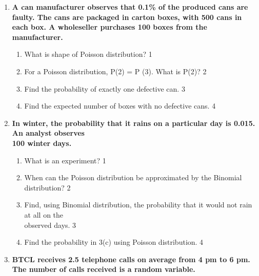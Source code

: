 \documentclass[a4paper,oneside]{book}
\begin{document}
\begin{enumerate}
  \begin{enumerate}
    \item
	What is another way to write $P(X \ge 1)$? \hfill 1
    \item
	Can the mean of Poisson distribution be negative? \hfill 2
    \item  
	From the given stem, find mean and variance. \hfill 3
    \item
	Find the expected frequencies and comment. \hfill 4
  \end{enumerate}
  
 \item
	  \textbf{A can manufacturer observes that 0.1\% of the produced cans are faulty. The cans are packaged in carton boxes, with 500 cans in each box. A wholeseller purchases 100 boxes from the manufacturer.} 
  
  \begin{enumerate}
    \item
	What is shape of Poisson distribution? \hfill 1
    \item
	For a Poisson distribution, P(2) = P (3). What is P(2)? \hfill 2
    \item  
	Find the probability of exactly one defective can. \hfill 3
    \item
	Find the expected number of boxes with no defective cans. \hfill 4
  \end{enumerate}
  
  \item
  \textbf{In winter, the probability that it rains on a particular day is 0.015. An analyst observes \\ 100 winter days.}
 
  \begin{enumerate}
    \item
	What is an experiment? \hfill 1
    \item
    	When can the Poisson distribution be approximated by the Binomial distribution? \hfill 2
    \item
    	Find, using Binomial distribution, the probability that  it would not rain at all on the \\ observed days. \hfill 3
     \item
     	Find the probability in 3(c) using Poisson distribution.  \hfill 4
  \end{enumerate}

  \item
	  \textbf{BTCL receives 2.5 telephone calls on average from 4 pm to 6 pm. The number of calls received is a random variable. } 
  

\end{enumerate}
\end{document}
